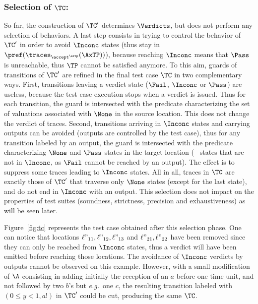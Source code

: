 \documentclass{LMCS}
\theoremstyle{plain}\newtheorem{proposition}[thm]{Proposition}
\def\eg{{\em e.g.}}
\begin{document}
\subsubsection*{Selection of $\TC$:}
So far, the construction of $\TC'$ determines $\Verdicts$, but does
not perform any selection of behaviors.  A last step consists in
trying to control the behavior of $\TC'$ in order to avoid $\Inconc$
states (thus stay in $\pref(\traces_{\accept^\axtp}(\AxTP))$),
because reaching $\Inconc$ means that $\Pass$ is unreachable, thus $\TP$ 
cannot be satisfied anymore.  
To this aim, guards of transitions of $\TC'$ are refined in the final
test case $\TC$ in two complementary ways.  First, transitions leaving
a verdict state ($\Fail$, $\Inconc$ or $\Pass$) are useless, because
the test case execution stops when a verdict is issued.  Thus for each
transition, the guard is intersected with the predicate characterizing
the set of valuations associated with $\None$ in the source location.
This does not change the verdict of traces.  
Second, transitions
arriving in $\Inconc$ states and carrying outputs can be avoided
(outputs are controlled by the test case), thus for any transition
labeled by an output, the guard is intersected with the predicate
characterizing $\None$ and $\Pass$ states in the target location (\ie~
states that are not in $\Inconc$, as $\Fail$ cannot be reached by an
output).  The effect is to suppress some traces leading to $\Inconc$
states.  
All in all, traces in $\TC$ are exactly those of $\TC'$ that
traverse only $\None$ states (except for the last state), 
and do not end in $\Inconc$ with an output.
This selection does not impact on the properties of test suites
(soundness, strictness, precision and exhaustiveness) as will be seen later.

\begin{exa}
Figure~\ref{fig:tc} represents the test case obtained after this selection phase.
One can notice that locations $\ell"_{11},\ell"_{12},\ell"_{13}$ and $\ell"_{21},\ell"_{22}$
have been removed since they can only be reached from $\Inconc$ states, 
thus a verdict will have been emitted before reaching those locations.
The avoidance of $\Inconc$ verdicts by outputs cannot be observed on this example.
However,  with a small modification of $\A$ 
consisting in adding initially the reception of an $a$  before one time unit, 
and not followed by two $b$'s but \eg~one $c$, the resulting transition 
labeled with $(0\leq y <1, a!)$ in $\TC'$ could be cut, producing the same $\TC$. 
\end{exa}
\end{document}
